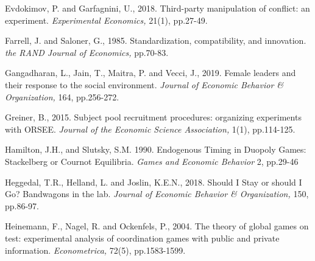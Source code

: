 \documentclass[12pt, letterpaper]{article}
\theoremstyle{plain}
\begin{document}
\begin{thebibliography}{10}
  Evdokimov, P. and Garfagnini, U., 2018. Third-party manipulation of conflict: an experiment. \textit{Experimental Economics,} 21(1), pp.27-49.

  Farrell, J. and Saloner, G., 1985. Standardization, compatibility, and innovation. \textit{the RAND Journal of Economics,} pp.70-83.

\bibitem{} Gangadharan, L., Jain, T., Maitra, P. and Vecci, J., 2019. Female leaders and their response to the social environment. \textit{Journal of Economic Behavior \& Organization,} 164, pp.256-272.




\bibitem{} Greiner, B., 2015. Subject pool recruitment procedures: organizing experiments with ORSEE. \textit{Journal of the Economic Science Association,} 1(1), pp.114-125.




\bibitem{} Hamilton, J.H., and Slutsky, S.M. 1990. Endogenous Timing in Duopoly Games: Stackelberg or Cournot Equilibria. \textit{Games and Economic Behavior} 2, pp.29-46

\bibitem{} Heggedal, T.R., Helland, L. and Joslin, K.E.N., 2018. Should I Stay or should I Go? Bandwagons in the lab. \textit{Journal of Economic Behavior \& Organization,} 150, pp.86-97.

\bibitem{}Heinemann, F., Nagel, R. and Ockenfels, P., 2004. The theory of global games on test: experimental analysis of coordination games with public and private information. \textit{Econometrica, } 72(5), pp.1583-1599.


\end{thebibliography}
\end{document}
